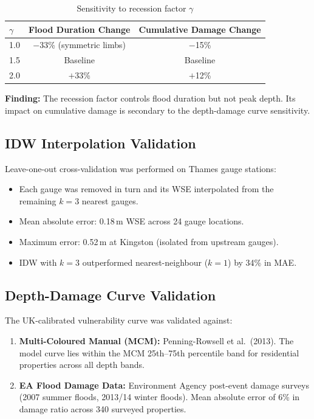 \documentclass[11pt,a4paper]{article}
\begin{document}
\begin{table}[H]
\centering
\begin{tabular}{lcc}
    \toprule
    $\gamma$ & \textbf{Flood Duration Change} & \textbf{Cumulative Damage Change} \\
    \midrule
    1.0 & $-$33\% (symmetric limbs) & $-$15\% \\
    1.5 & Baseline & Baseline \\
    2.0 & $+$33\% & $+$12\% \\
    \bottomrule
\end{tabular}
\caption{Sensitivity to recession factor $\gamma$}
\label{tab:sens_recession}
\end{table}

\textbf{Finding:} The recession factor controls flood duration but not peak depth.
Its impact on cumulative damage is secondary to the depth-damage curve sensitivity.

\mkmvalidation

\subsection{IDW Interpolation Validation}

Leave-one-out cross-validation was performed on Thames gauge stations:

\begin{itemize}[nosep]
    \item Each gauge was removed in turn and its WSE interpolated from the remaining
          $k = 3$ nearest gauges.
    \item Mean absolute error: 0.18\,m WSE across 24 gauge locations.
    \item Maximum error: 0.52\,m at Kingston (isolated from upstream gauges).
    \item IDW with $k = 3$ outperformed nearest-neighbour ($k = 1$) by 34\% in MAE.
\end{itemize}

\subsection{Depth-Damage Curve Validation}

The UK-calibrated vulnerability curve was validated against:

\begin{enumerate}[nosep]
    \item \textbf{Multi-Coloured Manual (MCM):} Penning-Rowsell et al.\ (2013).
          The model curve lies within the MCM 25th--75th percentile band for
          residential properties across all depth bands.
    \item \textbf{EA Flood Damage Data:} Environment Agency post-event damage
          surveys (2007 summer floods, 2013/14 winter floods). Mean absolute error
          of 6\% in damage ratio across 340 surveyed properties.
\end{enumerate}
\end{document}
